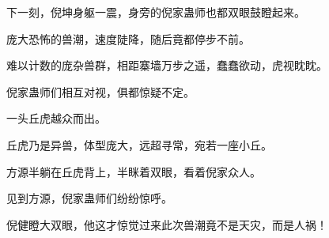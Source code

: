 \begin{this_body}
下一刻，倪坤身躯一震，身旁的倪家蛊师也都双眼鼓瞪起来。

庞大恐怖的兽潮，速度陡降，随后竟都停步不前。

难以计数的庞杂兽群，相距寨墙万步之遥，蠢蠢欲动，虎视眈眈。

倪家蛊师们相互对视，俱都惊疑不定。

一头丘虎越众而出。

丘虎乃是异兽，体型庞大，远超寻常，宛若一座小丘。

方源半躺在丘虎背上，半眯着双眼，看着倪家众人。

见到方源，倪家蛊师们纷纷惊呼。

倪健瞪大双眼，他这才惊觉过来此次兽潮竟不是天灾，而是人祸！

\end{this_body}

